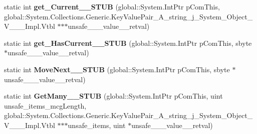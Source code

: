 \begin{DoxyCompactItemize}
\item 
\mbox{\label{struct_windows_1_1_foundation_1_1_collections_1_1_i_iterator___a___system___collections___generi1b6291336687b5a660c835303ec8be78_aadf6d332db165cca1e70267f291259b4}} 
static int {\bfseries get\+\_\+\+Current\+\_\+\+\_\+\+S\+T\+UB} (global\+::\+System.\+Int\+Ptr p\+Com\+This, global\+::\+System.\+Collections.\+Generic.\+Key\+Value\+Pair\+\_\+\+A\+\_\+string\+\_\+j\+\_\+\+System\+\_\+\+Object\+\_\+\+V\+\_\+\+\_\+\+\_\+\+Impl.\+Vtbl $\ast$$\ast$$\ast$unsafe\+\_\+\+\_\+\+\_\+value\+\_\+\+\_\+retval)
\item 
\mbox{\label{struct_windows_1_1_foundation_1_1_collections_1_1_i_iterator___a___system___collections___generi1b6291336687b5a660c835303ec8be78_add443a06ecf2aa75d8bab2ead931996f}} 
static int {\bfseries get\+\_\+\+Has\+Current\+\_\+\+\_\+\+S\+T\+UB} (global\+::\+System.\+Int\+Ptr p\+Com\+This, sbyte $\ast$unsafe\+\_\+\+\_\+\+\_\+value\+\_\+\+\_\+retval)
\item 
\mbox{\label{struct_windows_1_1_foundation_1_1_collections_1_1_i_iterator___a___system___collections___generi1b6291336687b5a660c835303ec8be78_a068db25123b46e77d725ebee9129c322}} 
static int {\bfseries Move\+Next\+\_\+\+\_\+\+S\+T\+UB} (global\+::\+System.\+Int\+Ptr p\+Com\+This, sbyte $\ast$unsafe\+\_\+\+\_\+\+\_\+value\+\_\+\+\_\+retval)
\item 
\mbox{\label{struct_windows_1_1_foundation_1_1_collections_1_1_i_iterator___a___system___collections___generi1b6291336687b5a660c835303ec8be78_a851195ff937680d7755e089305f881be}} 
static int {\bfseries Get\+Many\+\_\+\+\_\+\+S\+T\+UB} (global\+::\+System.\+Int\+Ptr p\+Com\+This, uint unsafe\+\_\+items\+\_\+mcg\+Length, global\+::\+System.\+Collections.\+Generic.\+Key\+Value\+Pair\+\_\+\+A\+\_\+string\+\_\+j\+\_\+\+System\+\_\+\+Object\+\_\+\+V\+\_\+\+\_\+\+\_\+\+Impl.\+Vtbl $\ast$$\ast$$\ast$unsafe\+\_\+items, uint $\ast$unsafe\+\_\+\+\_\+\+\_\+value\+\_\+\+\_\+retval)

\end{DoxyCompactItemize}
